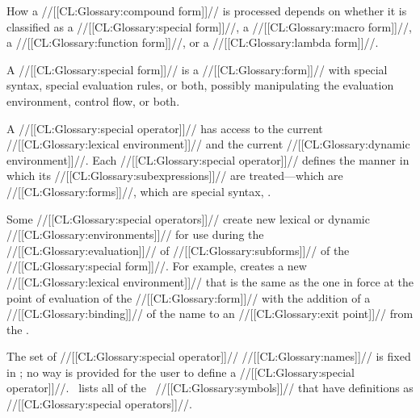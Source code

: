 How a //[[CL:Glossary:compound form]]// is processed depends on whether it is 
classified as a //[[CL:Glossary:special form]]//, a //[[CL:Glossary:macro form]]//, 
a //[[CL:Glossary:function form]]//, or a //[[CL:Glossary:lambda form]]//.



A //[[CL:Glossary:special form]]// is a //[[CL:Glossary:form]]// with special syntax,
special evaluation rules, or both, possibly manipulating the
evaluation environment, control flow, or both.




A //[[CL:Glossary:special operator]]// has access to
    the current //[[CL:Glossary:lexical environment]]// 
and the current //[[CL:Glossary:dynamic environment]]//.
Each //[[CL:Glossary:special operator]]// defines the manner in which its //[[CL:Glossary:subexpressions]]//
are treated---which are //[[CL:Glossary:forms]]//, which are special syntax, \etc.

Some //[[CL:Glossary:special operators]]// create new 
lexical or dynamic //[[CL:Glossary:environments]]// for use during the 
//[[CL:Glossary:evaluation]]// of //[[CL:Glossary:subforms]]//
of the //[[CL:Glossary:special form]]//.  For example,  creates a
new //[[CL:Glossary:lexical environment]]// that is the same as the one in force
at the point of evaluation of the  //[[CL:Glossary:form]]//
with the addition of a //[[CL:Glossary:binding]]// of the  name
to an //[[CL:Glossary:exit point]]// from the .






The set of //[[CL:Glossary:special operator]]// //[[CL:Glossary:names]]// is fixed in \clisp; 
no way is provided for the user to define a //[[CL:Glossary:special operator]]//.
\Thenextfigure\ lists all of the \clisp\ //[[CL:Glossary:symbols]]//
that have definitions as //[[CL:Glossary:special operators]]//.



















